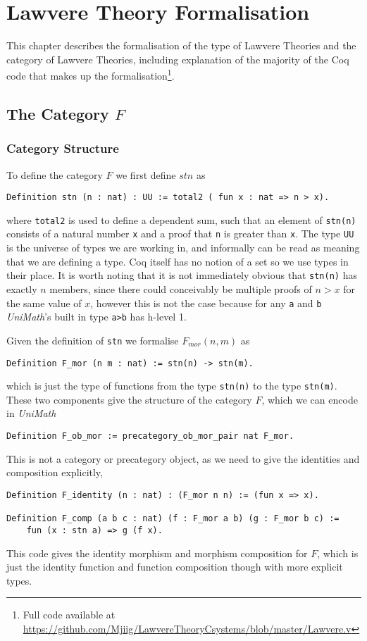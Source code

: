 \chapter{Lawvere Theory Formalisation}
This chapter describes the formalisation of the type of Lawvere Theories and the
category of Lawvere Theories, including explanation of the majority of the Coq
code that makes up the formalisation\footnote{Full code available at
\url{https://github.com/Mjiig/LawvereTheoryCsystems/blob/master/Lawvere.v}}.

\section{The Category $F$}
\subsection{Category Structure}
To define the category $F$ we first define $stn$ as
\begin{lstlisting}
Definition stn (n : nat) : UU := total2 ( fun x : nat => n > x).
\end{lstlisting}
where \lstinline|total2| is used to define a dependent sum, such that an element
of \lstinline|stn(n)| consists of a natural number \lstinline|x| and a proof
that \lstinline|n| is greater than \lstinline|x|. The type \lstinline|UU| is the
universe of types we are working in, and informally can be read as meaning that
we are defining a type. Coq itself has no notion of a set so we use types in
their place. It is worth noting that it is not immediately obvious that
\lstinline|stn(n)| has exactly $n$ members, since there could conceivably be
multiple proofs of $n>x$ for the same value of $x$, however this is not the case
because for any \lstinline|a| and \lstinline|b| \textit{UniMath}'s built in type
\lstinline|a>b| has h-level 1.

Given the definition of \lstinline|stn| we formalise $F_{mor}(n,m)$ as
\begin{lstlisting}
Definition F_mor (n m : nat) := stn(n) -> stn(m).
\end{lstlisting}
which is just the type of functions from the type \lstinline|stn(n)| to the type
\lstinline|stn(m)|. These two components give the structure of the category $F$,
which we can encode in \textit{UniMath}
\begin{lstlisting}
Definition F_ob_mor := precategory_ob_mor_pair nat F_mor.
\end{lstlisting}

This is not a category or precategory object, as we need to give the identities
and composition explicitly,
\begin{lstlisting}
Definition F_identity (n : nat) : (F_mor n n) := (fun x => x).

Definition F_comp (a b c : nat) (f : F_mor a b) (g : F_mor b c) :=
    fun (x : stn a) => g (f x).
\end{lstlisting}
This code gives the identity morphism and morphism composition for $F$, which is
just the identity function and function composition though with more explicit
types.

